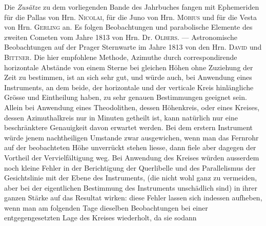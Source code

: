 Die \emph{Zusätze} zu dem vorliegenden Bande des Jahrbuches fangen mit Ephemeriden für die Pallas
von Hrn. \textsc{Nicolai}, für die Juno von Hrn. \textsc{Möbius} und für die Vesta von Hrn.
\textsc{Gerling} an. Es folgen Beobachtungen und parabolische Elemente des zweiten Cometen vom
Jahre 1813 von Hrn. Dr. \textsc{Olbers}. --- Astronomische Beobachtungen auf der Prager Sternwarte
im Jahre 1813 von den Hrn. \textsc{David} und \textsc{Bittner}. Die hier empfohlene Methode,
Azimuthe durch correspondirende horizontale Abstände von einem Sterne bei gleichen Höhen ohne
Zuziehung der Zeit zu bestimmen, ist an sich sehr gut, und würde auch, bei Anwendung eines
Instruments, an dem beide, der horizontale und der verticale Kreis hinlängliche Grösse und
Eintheilung haben, zu sehr genauen Bestimmungen geeignet sein. Allein bei Anwendung eines
Theodolithen, dessen Höhenkreis, oder eines Kreises, dessen Azimuthalkreis nur in Minuten
getheilt ist, kann natürlich nur eine beschränktere Genauigkeit davon erwartet werden. Bei dem
erstern Instrument würde jenem nachtheiligen Umstande zwar ausgewichen, wenn man das Fernrohr auf
der beobachteten Höhe unverrückt stehen liesse, dann fiele aber dagegen der Vortheil der
Vervielfältigung weg. Bei Anwendung des Kreises würden ausserdem noch kleine Fehler in der
Berichtigung der Querlibelle und des Parallelismus der Gesichtslinie mit der Ebene des
Instruments, (die nicht wohl ganz zu vermeiden, aber bei der eigentlichen Bestimmung des Instruments
unschädlich sind) in ihrer ganzen Stärke auf das Resultat wirken: diese Fehler lassen sich
indessen aufheben, wenn man am folgenden Tage dieselben Beobachtungen bei einer entgegengesetzten
Lage des Kreises wiederholt, da sie sodann
